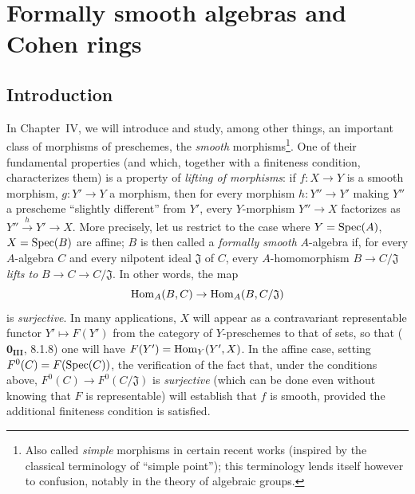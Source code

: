 \section{Formally smooth algebras and Cohen rings}
\label{section:0.19}

\setcounter{subsection}{-1}
\subsection{Introduction}
\label{subsection:0.19.0}
\label{0.19.0}

\begin{env}[19.0.1]
\label{0.19.0.1}
In Chapter~IV, we will introduce and study, among other things, an important class of morphisms of preschemes, the \emph{smooth} morphisms\footnote{Also called \emph{simple} morphisms in certain recent works (inspired by the classical terminology of ``simple point''); this terminology lends itself however to confusion, notably in the theory of algebraic groups.}.
One of their fundamental properties (and which, together with a finiteness condition, characterizes them) is a property of \emph{lifting of morphisms}:
if $f:X\to Y$ is a smooth morphism, $g:Y'\to Y$ a morphism, then for every morphism $h:Y''\to Y'$ making $Y''$ a prescheme ``slightly different'' from $Y'$, every $Y$-morphism $Y''\to X$ factorizes as $Y''\xrightarrow{h}Y'\to X$.
More precisely, let us restrict to the case where $Y=\operatorname{Spec}(A)$, $X=\operatorname{Spec}(B)$ are affine;
$B$ is then called a \emph{formally smooth} $A$-algebra if, for every $A$-algebra $C$ and every nilpotent ideal $\mathfrak{J}$ of $C$, every $A$-homomorphism $B\to C/\mathfrak{J}$ \emph{lifts to} $B\to C\to C/\mathfrak{J}$.
In other words, the map
\[
  \operatorname{Hom}_A(B,C) \to \operatorname{Hom}_A(B,C/\mathfrak{J})
\]
is \emph{surjective}.
In many applications, $X$ will appear as a contravariant representable functor $Y'\mapsto F(Y')$ from the category of $Y$-preschemes to that of sets, so that ($\mathbf{0_{III}}$, 8.1.8) one will have $F(Y')=\operatorname{Hom}_Y(Y',X)$.
In the affine case, setting $F^0(C)=F(\operatorname{Spec}(C))$, the verification of the fact that, under the conditions above, $F^0(C)\to F^0(C/\mathfrak{J})$ is \emph{surjective} (which can be done even without knowing that $F$ is representable) will establish that $f$ is smooth, provided the additional finiteness condition is satisfied.
\end{env}

